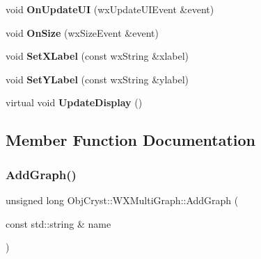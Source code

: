 \begin{DoxyCompactItemize}
void {\bfseries On\+Update\+UI} (wx\+Update\+U\+I\+Event \&event)
\item 
\mbox{\label{class_obj_cryst_1_1_w_x_multi_graph_ae9a6be4b7ff5264276c96f0a5de3b600}} 
void {\bfseries On\+Size} (wx\+Size\+Event \&event)
\item 
\mbox{\label{class_obj_cryst_1_1_w_x_multi_graph_a318960f56cfbe488b5dfab5fc3ef48ee}} 
void {\bfseries Set\+X\+Label} (const wx\+String \&xlabel)
\item 
\mbox{\label{class_obj_cryst_1_1_w_x_multi_graph_ad2710816b98b19b3548a2e40aea6399e}} 
void {\bfseries Set\+Y\+Label} (const wx\+String \&ylabel)
\item 
\mbox{\label{class_obj_cryst_1_1_w_x_multi_graph_a8beeabc9c5e9d0ab9a1b8bd651876d86}} 
virtual void {\bfseries Update\+Display} ()
\end{DoxyCompactItemize}


\subsection{Member Function Documentation}
\mbox{\label{class_obj_cryst_1_1_w_x_multi_graph_adf6e7de19af871df66a70214dad61905}} 
\subsubsection{\texorpdfstring{AddGraph()}{AddGraph()}}
{\footnotesize\ttfamily unsigned long Obj\+Cryst\+::\+W\+X\+Multi\+Graph\+::\+Add\+Graph (\begin{DoxyParamCaption}\item[{const std\+::string \&}]{name }\end{DoxyParamCaption})}

